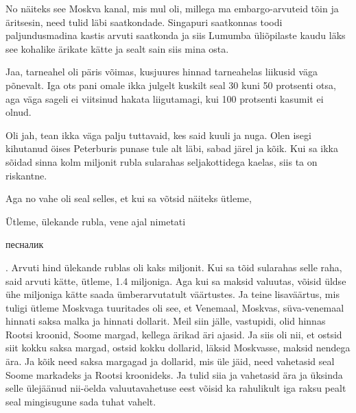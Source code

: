 
No näiteks see Moskva kanal, mis mul oli, millega ma embargo-arvuteid tõin ja äritsesin, need tulid läbi saatkondade. Singapuri saatkonnas toodi paljundusmadina kastis arvuti saatkonda ja siis Lumumba üliõpilaste kaudu läks see kohalike ärikate kätte ja sealt sain siis mina osta. 


Jaa, tarneahel oli päris võimas, kusjuures hinnad tarneahelas liikusid väga põnevalt. Iga ots pani omale ikka julgelt kuskilt seal 30 kuni 50 protsenti otsa, aga väga sageli ei viitsinud hakata liigutamagi, kui 100 protsenti kasumit ei olnud. 


Oli jah, tean ikka väga palju tuttavaid, kes said kuuli ja nuga. Olen isegi kihutanud öises Peterburis punase tule alt läbi, sabad järel ja kõik. Kui sa ikka sõidad sinna kolm miljonit rubla sularahas seljakottidega kaelas, siis ta on riskantne.

Aga no vahe oli seal selles, et kui sa võtsid näiteks ütleme, 

Ütleme, ülekande rubla, vene ajal nimetati \begin{russian}песналик\end{russian}. Arvuti hind ülekande rublas oli kaks miljonit. Kui sa tõid sularahas selle raha, said arvuti kätte, ütleme, 1.4 miljoniga. Aga kui sa maksid valuutas, võisid üldse  ühe miljoniga kätte saada ümberarvutatult väärtustes. Ja teine lisaväärtus, mis tuligi ütleme Moskvaga tuuritades oli see, et Venemaal, Moskvas, süva-venemaal hinnati saksa malka ja hinnati dollarit. Meil siin jälle, vastupidi, olid hinnas Rootsi kroonid, Soome margad, kellega ärikad äri ajasid. Ja siis oli nii, et ostsid siit kokku saksa margad, ostsid kokku dollarid, läksid Moskvasse, maksid nendega ära. Ja kõik need saksa margagad ja dollarid, mis üle jäid, need vahetasid seal Soome markadeks ja Rootsi kroonideks. Ja tulid siia ja vahetasid ära ja üksinda selle ülejäänud nii-öelda valuutavahetuse eest võisid ka rahulikult iga raksu pealt seal mingisugune sada tuhat vahelt. 

